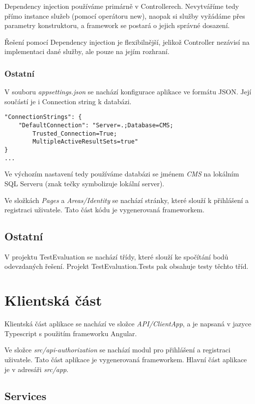 Dependency injection používáme primárně v Controllerech.
Nevytváříme tedy přímo instance služeb (pomocí operátoru new), naopak si služby vyžádáme přes parametry konstruktoru, a framework se postará o jejich správné dosazení.

Řešení pomocí Dependency injection je flexibilnější, jelikož Controller nezávisí na implementaci dané služby, ale pouze na jejím rozhraní.

\subsubsection*{Ostatní}

V souboru \textit{appsettings.json} se nachází konfigurace aplikace ve formátu JSON. Její součástí je i Connection string k databázi. 
\begin{lstlisting}
"ConnectionStrings": {
	"DefaultConnection": "Server=.;Database=CMS;
		Trusted_Connection=True;
		MultipleActiveResultSets=true" 
}
...
\end{lstlisting}

Ve výchozím nastavení tedy používáme databázi se jménem \textit{CMS} na lokálním SQL Serveru (znak tečky symbolizuje lokální server).

Ve složkách \textit{Pages} a \textit{Areas/Identity} se nachází stránky, které slouží k přihlášení a registraci uživatele. Tato část kódu je vygenerovaná frameworkem.


\subsection{Ostatní}

V projektu TestEvaluation se nachází třídy, které slouží ke spočítání bodů odevzdaných řešení. Projekt TestEvaluation.Tests pak obsahuje testy těchto tříd.

\section{Klientská část}
\lstset{style=typescript}

Klientská část aplikace se nachází ve složce \textit{API/ClientApp}, a je napsaná v jazyce Typescript s použitím frameworku Angular. 

Ve složce \textit{src/api-authorization} se nachází modul pro přihlášení a registraci uživatele. Tato část aplikace je vygenerovaná frameworkem. Hlavní část aplikace je v adresáři \textit{src/app}.

\subsection{Services}

